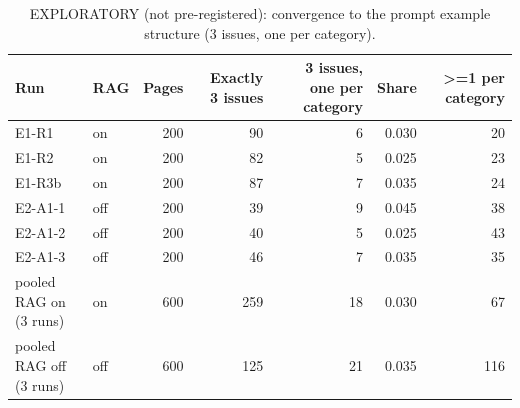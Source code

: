 \begin{table}[t]
\centering
\small
\caption{EXPLORATORY (not pre-registered): convergence to the prompt example structure (3 issues, one per category).}
\label{tab:e7-exp-conv}
\begin{tabular}{llrrrrr}
\toprule
Run & RAG & Pages & Exactly 3 issues & 3 issues, one per category & Share & >=1 per category \\
\midrule
E1-R1 & on & 200 & 90 & 6 & 0.030 & 20 \\
E1-R2 & on & 200 & 82 & 5 & 0.025 & 23 \\
E1-R3b & on & 200 & 87 & 7 & 0.035 & 24 \\
E2-A1-1 & off & 200 & 39 & 9 & 0.045 & 38 \\
E2-A1-2 & off & 200 & 40 & 5 & 0.025 & 43 \\
E2-A1-3 & off & 200 & 46 & 7 & 0.035 & 35 \\
pooled RAG on (3 runs) & on & 600 & 259 & 18 & 0.030 & 67 \\
pooled RAG off (3 runs) & off & 600 & 125 & 21 & 0.035 & 116 \\
\bottomrule
\end{tabular}
\end{table}
